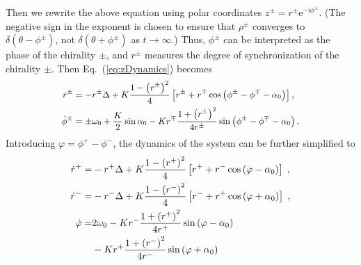 \documentclass{article}
\begin{document}
Then we rewrite the above equation using polar coordinates $z^{\pm}=r^{\pm}\mathrm{e}^{-\mathrm{i}\phi ^{\pm}}$. (The negative sign in the exponent is chosen to ensure that $\rho^{\pm}$ converges to $\delta\left(\theta-\phi^{\pm}\right)$, not $\delta\left(\theta+\phi^{\pm}\right)$ as $t\rightarrow\infty$.) Thus, $\phi^{\pm}$ can be interpreted as the phase of the chirality $\pm$, and $r^{\pm}$ measures the degree of synchronization of the chirality $\pm$. 
Then Eq.~(\ref{eq:zDynamics}) becomes
\begin{subequations}
    \small
    \begin{align}
        \dot{r}^{\pm}&=-r^{\pm}\Delta +K\frac{1 -\left( r^{\pm} \right) ^2}{4}\left[ r^{\pm}+r^{\mp}\cos \left( \phi ^{\pm}-\phi ^{\mp}-\alpha _0 \right) \right] ,\\
        \dot{\phi}^{\pm}&=\pm\omega_0+\frac{K}{2}\sin \alpha _0-Kr^{\mp}\frac{1+\left( r^{\pm} \right) ^2}{4r^{\pm}}\sin \left( \phi ^{\pm}-\phi ^{\mp}-\alpha _0 \right) .
    \end{align}
\end{subequations}
Introducing $\varphi=\phi^+-\phi^-$, the dynamics of the system can be further simplified to
\begin{subequations}
    \begin{align}
        \dot{r}^+=&-r^+\Delta +K\frac{1-\left( r^+ \right) ^2}{4}\left[ r^++r^-\cos \left( \varphi -\alpha _0 \right) \right] \;,\\
        \dot{r}^-=&-r^-\Delta +K\frac{1-\left( r^- \right) ^2}{4}\left[ r^-+r^+\cos \left( \varphi +\alpha _0 \right) \right] \;,\\
        \dot{\varphi}=&2\omega_0-Kr^-\frac{1+\left( r^+ \right) ^2}{4r^+}\sin \left( \varphi -\alpha _0 \right)\notag\\
        &-Kr^+\frac{1+\left( r^- \right) ^2}{4r^-}\sin \left( \varphi +\alpha _0 \right)
    \end{align}
\end{subequations}
\end{document}
